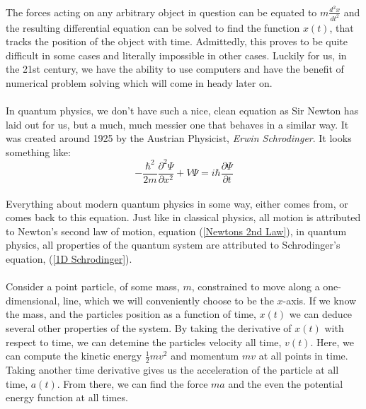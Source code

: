 \documentclass[12pt,letterpaper]{book}
\begin{document}
\paragraph*{}The forces acting on any arbitrary object in question can be equated to $m\frac{d^2x}{dt^2}$ and the resulting differential equation can be solved to find the function $x(t)$, that tracks the position of the object with time. Admittedly, this proves to be quite difficult in some cases and literally impossible in other cases. Luckily for us, in the 21st century, we have the ability to use computers and have the benefit of numerical problem solving which will come in heady later on.
\paragraph*{}In quantum physics, we don't have such a nice, clean equation as Sir Newton has laid out for us, but a much, much messier one that behaves in a similar way. It was created around 1925 by the Austrian Physicist, \textit{Erwin Schrodinger}. It looks something like:
\begin{equation}
\label{1D Schrodinger}
-\frac{\hbar^2}{2m}\frac{\partial^2\Psi}{\partial x^2} +
V\Psi = i\hbar\frac{\partial \Psi}{\partial t}
\end{equation}
\paragraph*{}Everything about modern quantum physics in some way, either comes from, or comes back to this equation. Just like in classical physics, all motion is attributed to Newton's second law of motion, equation (\ref{Newtons 2nd Law}), in quantum physics, all properties of the quantum system are attributed to Schrodinger's equation, (\ref{1D Schrodinger}).


\paragraph*{}Consider a point particle, of some mass, $m$, constrained to move along a one-dimensional, line, which we will conveniently choose to be the $x$-axis. If we know the mass, and the particles position as a function of time, $x(t)$ we can deduce several other properties of the system. By taking the derivative of $x(t)$ with respect to time, we can detemine the particles velocity all time, $v(t)$. Here, we can compute the kinetic energy $\frac{1}{2}mv^2$ and momentum $mv$ at all points in time. Taking another time derivative gives us the acceleration of the particle at all time, $a(t)$. From there, we can find the force $ma$ and the even the potential energy function at all times. 
\end{document}
